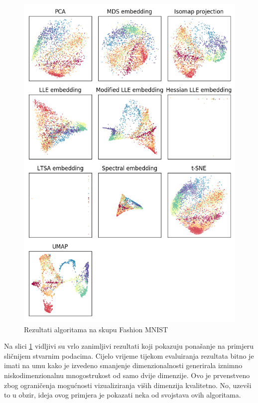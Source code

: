 \documentclass[times, utf8, diplomski]{fer}
\begin{document}
\begin{figure}[htb]
    \centering
    \includegraphics[width=\textwidth]{resources/images/reduction/compare/xfmnist.png}
    \caption{Rezultati algoritama na skupu Fashion MNIST}
    \label{fig:xfmnist}
\end{figure}

Na slici \ref{fig:xfmnist} vidljivi su vrlo zanimljivi rezultati koji pokazuju ponašanje na primjeru sličnijem stvarnim podacima. Cijelo vrijeme tijekom evaluiranja rezultata bitno je imati na umu kako je izvedeno smanjenje dimenzionalnosti generirala iznimno niskodimenzionalnu mnogostrukost od samo dvije dimenzije. Ovo je prvenstveno zbog ograničenja mogućnosti vizualiziranja viših dimenzija kvalitetno. No, uzevši to u obzir, ideja ovog primjera je pokazati neka od svojstava ovih algoritama.
\end{document}
